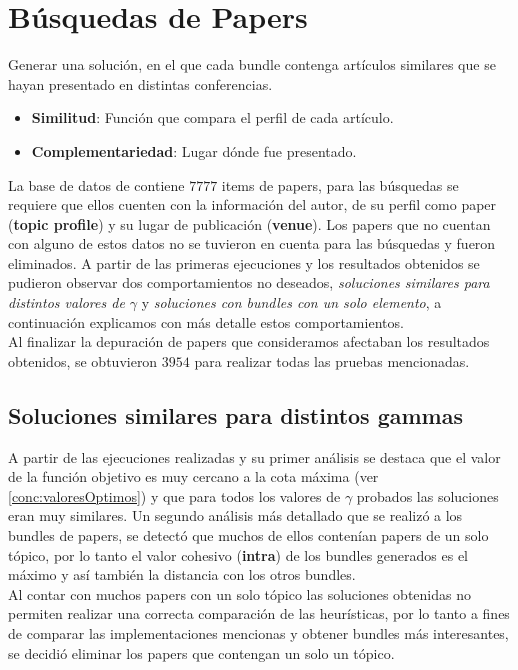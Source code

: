 \section{Búsquedas de Papers}\label{res:busPaper}
Generar una solución, en el que cada bundle contenga artículos similares que se hayan presentado en distintas conferencias.\\
\begin{itemize}
  \item \textbf{Similitud}: Función que compara el perfil de cada artículo.
  \item \textbf{Complementariedad}: Lugar dónde fue presentado.
\end{itemize}

La base de datos de \cite{dataDrive} contiene $7777$ items de papers, para las búsquedas se requiere que ellos cuenten con la información del autor, de su perfil como paper (\textbf{topic profile}) y su lugar de publicación (\textbf{venue}). Los papers que no cuentan con alguno de estos datos no se tuvieron en cuenta para las búsquedas y fueron eliminados. A partir de las primeras ejecuciones y los resultados obtenidos se pudieron observar dos comportamientos no deseados, \textit{soluciones similares para distintos valores de $\gamma$} y \textit{soluciones con bundles con un solo elemento}, a continuación explicamos con más detalle estos comportamientos.\\
Al finalizar la depuración de papers que consideramos afectaban los resultados obtenidos, se obtuvieron $3954$ para realizar todas las pruebas mencionadas.
\subsection{Soluciones similares para distintos gammas}
A partir de las ejecuciones realizadas y su primer análisis se destaca que el valor de la función objetivo es muy cercano a la cota máxima (ver \ref{conc:valoresOptimos}) y que para todos los valores de $\gamma$ probados las soluciones eran muy similares. Un segundo análisis más detallado que se realizó a los bundles de papers, se detectó que muchos de ellos contenían papers de un solo tópico, por lo tanto el valor cohesivo (\textbf{intra}) de los bundles generados es el máximo y así también la distancia con los otros bundles.\\
Al contar con muchos papers con un solo tópico las soluciones obtenidas no permiten realizar una correcta comparación de las heurísticas, por lo tanto a fines de comparar las implementaciones mencionas y obtener bundles más interesantes, se decidió eliminar los papers que contengan un solo un tópico.
